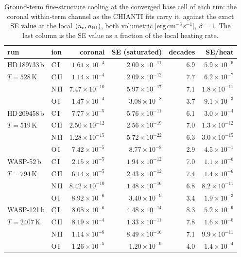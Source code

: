 \documentclass[english,a4paper]{my_memo}
\begin{document}
\begin{table}[htbp]
\centering
\caption{Ground-term fine-structure cooling at the converged base cell of
each run: the coronal within-term channel as the CHIANTI fits carry it,
against the exact SE value at the local $(n_e,n_{\rm HI})$, both
volumetric [erg\,cm$^{-3}$\,s$^{-1}$], $\beta=1$.  The last column is the
SE value as a fraction of the local heating rate.}
\label{tab:fsover}
\begin{tabular}{llrrrr}
\hline
run & ion & coronal & SE (saturated) & decades & SE/heat \\
\hline
HD\,189733\,b   & C\,I  & $1.61\times10^{-4}$ & $2.00\times10^{-11}$ & 6.9 & $5.9\times10^{-6}$\\
$T=528$\,K      & C\,II & $1.14\times10^{-4}$ & $2.09\times10^{-12}$ & 7.7 & $6.2\times10^{-7}$\\
                & N\,II & $7.47\times10^{-10}$& $5.97\times10^{-17}$ & 7.1 & $1.8\times10^{-11}$\\
                & O\,I  & $1.47\times10^{-4}$ & $3.08\times10^{-8}$  & 3.7 & $9.1\times10^{-3}$\\
\hline
HD\,209458\,b   & C\,I  & $7.77\times10^{-5}$ & $5.76\times10^{-11}$ & 6.1 & $3.0\times10^{-4}$\\
$T=519$\,K      & C\,II & $2.50\times10^{-12}$& $2.56\times10^{-19}$ & 7.0 & $1.3\times10^{-12}$\\
                & N\,II & $1.28\times10^{-15}$& $5.72\times10^{-22}$ & 6.3 & $3.0\times10^{-15}$\\
                & O\,I  & $7.42\times10^{-5}$ & $8.77\times10^{-8}$  & 2.9 & $4.5\times10^{-1}$\\
\hline
WASP-52\,b      & C\,I  & $2.15\times10^{-5}$ & $1.94\times10^{-12}$ & 7.0 & $1.1\times10^{-6}$\\
$T=794$\,K      & C\,II & $6.14\times10^{-5}$ & $2.43\times10^{-12}$ & 7.4 & $1.4\times10^{-6}$\\
                & N\,II & $8.42\times10^{-10}$& $1.48\times10^{-16}$ & 6.8 & $8.2\times10^{-11}$\\
                & O\,I  & $8.92\times10^{-6}$ & $3.40\times10^{-9}$  & 3.4 & $1.9\times10^{-3}$\\
\hline
WASP-121\,b     & C\,I  & $8.08\times10^{-6}$ & $4.48\times10^{-14}$ & 8.3 & $5.2\times10^{-9}$\\
$T=2407$\,K     & C\,II & $8.19\times10^{-4}$ & $1.33\times10^{-11}$ & 7.8 & $1.6\times10^{-6}$\\
                & N\,II & $1.14\times10^{-8}$ & $8.49\times10^{-16}$ & 7.1 & $9.9\times10^{-11}$\\
                & O\,I  & $1.26\times10^{-5}$ & $1.20\times10^{-9}$  & 4.0 & $1.4\times10^{-4}$\\
\hline
\end{tabular}
\end{table}
\end{document}
